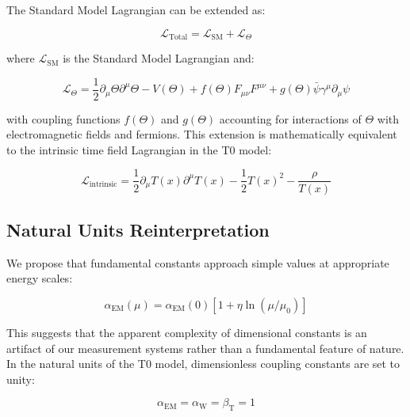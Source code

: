 \documentclass[12pt,a4paper]{article}
\newcommand{\Tfield}{T(x)}
\newcommand{\alphaEM}{\alpha_{\text{EM}}}
\newcommand{\alphaW}{\alpha_{\text{W}}}
\newcommand{\betaT}{\beta_{\text{T}}}
\begin{document}
	The Standard Model Lagrangian can be extended as\cite{pascher_lagrange_2025}:
	
	\begin{equation}
		\label{eq:total_lagrangian}
		\mathcal{L}_{\text{Total}} = \mathcal{L}_{\text{SM}} + \mathcal{L}_{\Theta}
	\end{equation}
	
	where $\mathcal{L}_{\text{SM}}$ is the Standard Model Lagrangian and:
	
	\begin{equation}
		\label{eq:theta_lagrangian}
		\mathcal{L}_{\Theta} = \frac{1}{2}\partial_{\mu}\Theta\partial^{\mu}\Theta - V(\Theta) + f(\Theta)F_{\mu\nu}F^{\mu\nu} + g(\Theta)\bar{\psi}\gamma^{\mu}\partial_{\mu}\psi
	\end{equation}
	
	with coupling functions $f(\Theta)$ and $g(\Theta)$ accounting for interactions of $\Theta$ with electromagnetic fields and fermions. This extension is mathematically equivalent to the intrinsic time field Lagrangian in the T0 model\cite{pascher_qft_2025}:
	
	\begin{equation}
		\label{eq:intrinsic_lagrangian}
		\mathcal{L}_{\text{intrinsic}} = \frac{1}{2} \partial_\mu \Tfield \partial^\mu \Tfield - \frac{1}{2}\Tfield^2 - \frac{\rho}{\Tfield}
	\end{equation}
	
	\subsection{Natural Units Reinterpretation}
	\label{subsec:reinterpretation}
	
	We propose that fundamental constants approach simple values at appropriate energy scales\cite{pascher_alpha_2025}:
	
	\begin{equation}
		\label{eq:alpha_running}
		\alpha_{\text{EM}}(\mu) = \alpha_{\text{EM}}(0)[1 + \eta \ln(\mu/\mu_0)]
	\end{equation}
	
	This suggests that the apparent complexity of dimensional constants is an artifact of our measurement systems rather than a fundamental feature of nature\cite{duff2002}. In the natural units of the T0 model\cite{pascher_alpha_2025, pascher_alphabeta_2025}, dimensionless coupling constants are set to unity:
	
	\begin{equation}
		\label{eq:dimensionless_unity}
		\alphaEM = \alphaW = \betaT = 1
	\end{equation}
	
\end{document}
